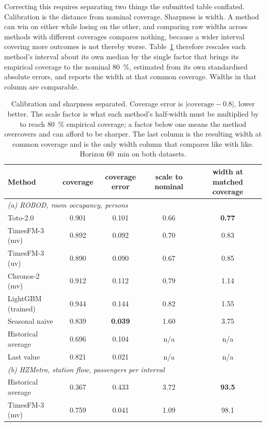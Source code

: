 \documentclass[11pt]{article}
\theoremstyle{plain}
\theoremstyle{definition}
\theoremstyle{remark}
\newcommand{\best}[1]{\textbf{#1}}
\newif\ifrevisionmarkup
\newcommand{\new}[1]{\ifrevisionmarkup\textcolor{revision}{#1}\else#1\fi}
\begin{document}
\new{Correcting this requires separating two things the submitted table conflated. Calibration is the distance from nominal coverage. Sharpness is width. A method can win on either while losing on the other, and comparing raw widths across methods with different coverages compares nothing, because a wider interval covering more outcomes is not thereby worse. Table~\ref{tab:matched} therefore rescales each method's interval about its own median by the single factor that brings its empirical coverage to the nominal \SI{80}{\percent}, estimated from its own standardised absolute errors, and reports the width at that common coverage. Widths in that column are comparable.}

\new{\begin{table}[htbp]
\centering
\caption{\new{Calibration and sharpness separated. Coverage error is $|\text{coverage} - 0.8|$, lower better. The scale factor is what each method's half-width must be multiplied by to reach \SI{80}{\percent} empirical coverage; a factor below one means the method overcovers and can afford to be sharper. The last column is the resulting width at common coverage and is the only width column that compares like with like. Horizon \SI{60}{\minute} on both datasets.}}
\label{tab:matched}
\small
\begin{tabular}{lcccc}
\toprule
Method & coverage & coverage error & scale to nominal & width at matched coverage \\
\midrule
\multicolumn{5}{l}{\emph{(a) ROBOD, room occupancy, persons}}\\
Toto-2.0            & 0.901 & 0.101 & 0.66 & \best{0.77} \\
TimesFM-3 (mv)      & 0.892 & 0.092 & 0.70 & 0.83 \\
TimesFM-3 (uv)      & 0.890 & 0.090 & 0.67 & 0.85 \\
Chronos-2 (mv)      & 0.912 & 0.112 & 0.79 & 1.14 \\
LightGBM (trained)  & 0.944 & 0.144 & 0.82 & 1.55 \\
Seasonal naive      & 0.839 & \best{0.039} & 1.60 & 3.75 \\
Historical average  & 0.696 & 0.104 & n/a & n/a \\
Last value          & 0.821 & 0.021 & n/a & n/a \\
\midrule
\multicolumn{5}{l}{\emph{(b) HZMetro, station flow, passengers per interval}}\\
Historical average  & 0.367 & 0.433 & 3.72 & \best{93.5} \\
TimesFM-3 (mv)      & 0.759 & 0.041 & 1.09 & 98.1 \\

\end{tabular}
\end{table}}
\end{document}
